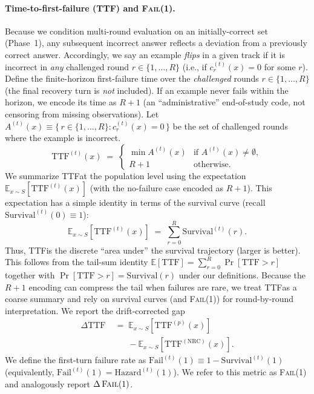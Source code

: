 \documentclass[11pt]{article}
\newcommand{\FailAt}[1]{\textsc{Fail}(#1)}
\newcommand{\TTF}{\textsc{TTF}}
\begin{document}
\paragraph{Time-to-first-failure (\TTF{}) and \FailAt{1}.}
Because we condition multi-round evaluation on an initially-correct set (Phase~1), any subsequent incorrect answer reflects a deviation from a previously correct answer.
Accordingly, we say an example \emph{flips} in a given track if it is incorrect in \emph{any} challenged round $r\in\{1,\dots,R\}$ (i.e., if $c^{(t)}_{r}(x)=0$ for some $r$).
Define the finite-horizon first-failure time over the \emph{challenged} rounds $r\in\{1,\dots,R\}$ (the final recovery turn is \emph{not} included). If an example never fails within the horizon, we encode its time as $R{+}1$ (an ``administrative'' end-of-study code, not censoring from missing observations). 
Let $A^{(t)}(x) \equiv \{\, r \in \{1,\dots,R\} : c^{(t)}_{r}(x)=0 \,\}$ be the set of challenged rounds where the example is incorrect.
\begin{equation}
\mathrm{TTF}^{(t)}(x)
\;=\;
\begin{cases}
\min A^{(t)}(x) & \text{if } A^{(t)}(x)\neq\emptyset,\\
R{+}1 & \text{otherwise}.
\end{cases}
\end{equation}
We summarize \TTF at the population level using the expectation $\mathbb{E}_{x\sim S}[\mathrm{TTF}^{(t)}(x)]$ (with the no-failure case encoded as $R{+}1$). This expectation has a simple identity in terms of the survival curve (recall $\mathrm{Survival}^{(t)}(0)\equiv 1$):
\begin{equation*}
\mathbb{E}_{x\sim S}[\mathrm{TTF}^{(t)}(x)] \;=\; \sum_{r=0}^{R} \mathrm{Survival}^{(t)}(r).
\end{equation*}
Thus, \TTF is the discrete ``area under'' the survival trajectory (larger is better). This follows from the tail-sum identity
\(\mathbb{E}[\mathrm{TTF}]=\sum_{r=0}^{R}\Pr[\mathrm{TTF}>r]\) together with \(\Pr[\mathrm{TTF}>r]=\mathrm{Survival}(r)\) under our definitions.
Because the $R{+}1$ encoding can compress the tail when failures are rare, we treat \TTF as a coarse summary and rely on survival curves (and \FailAt{1}) for round-by-round interpretation.
We report the drift-corrected gap
\begin{align}
\Delta\mathrm{TTF}
&\;=\; \mathbb{E}_{x\sim S}[\mathrm{TTF}^{(p)}(x)] \\
&\quad\;\;\; -\mathbb{E}_{x\sim S}[\mathrm{TTF}^{(\mathrm{NRC})}(x)].
\end{align}
We define the first-turn failure rate as $\mathrm{Fail}^{(t)}(1)\equiv 1-\mathrm{Survival}^{(t)}(1)$ (equivalently, $\mathrm{Fail}^{(t)}(1)=\mathrm{Hazard}^{(t)}(1)$). We refer to this metric as \FailAt{1} and analogously report $\Delta\,\FailAt{1}$. 
\end{document}
